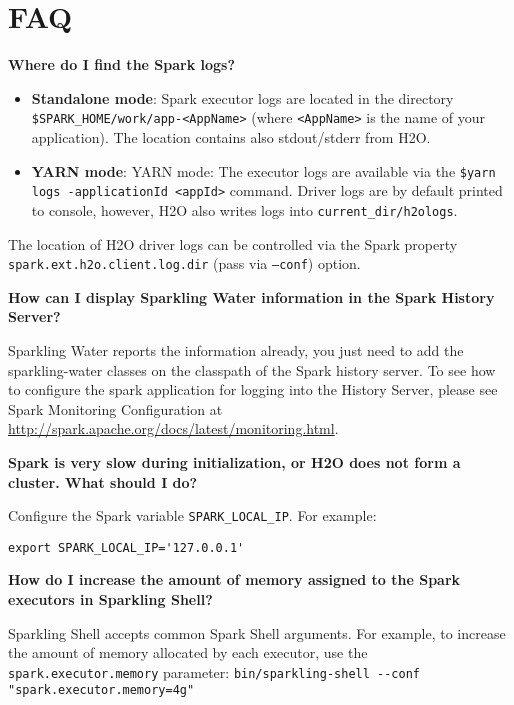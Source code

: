 \section{FAQ}



\textbf{Where do I find the Spark logs?}

\begin{itemize}
    \item \textbf{Standalone mode}: Spark executor logs are located in the directory {\lstinline[style=Bash]|$SPARK_HOME/work/app-<AppName>|} (where \texttt{<AppName>} is the name of your application). The location contains also stdout/stderr from H2O.
    \item \textbf{YARN mode}: YARN mode: The executor logs are available via the {\lstinline[style=Bash]|$yarn logs -applicationId <appId>|} command. Driver logs are by default printed to console, however, H2O also writes logs into \texttt{current\_dir/h2ologs}.
\end{itemize}

The location of H2O driver logs can be controlled via the Spark property \\ \texttt{spark.ext.h2o.client.log.dir} (pass via \texttt{--conf}) option.

\textbf{How can I display Sparkling Water information in the Spark History Server?}

Sparkling Water reports the information already, you just need to add the sparkling-water classes on the classpath of the Spark history server. To see how to configure the spark application for logging into the History Server, please see Spark Monitoring Configuration at
\url{http://spark.apache.org/docs/latest/monitoring.html}.

\textbf{Spark is very slow during initialization, or H2O does not form a cluster. What should I do?}

Configure the Spark variable \texttt{SPARK\_LOCAL\_IP}. For example:
       
\begin{lstlisting}[style=Bash]
export SPARK_LOCAL_IP='127.0.0.1'
\end{lstlisting}

\textbf{How do I increase the amount of memory assigned to the Spark executors in Sparkling Shell?}

Sparkling Shell accepts common Spark Shell arguments. For example, to increase the amount of memory allocated by each executor, use the \\ \texttt{spark.executor.memory} parameter: {\lstinline[style=Bash]|bin/sparkling-shell --conf "spark.executor.memory=4g"|}

